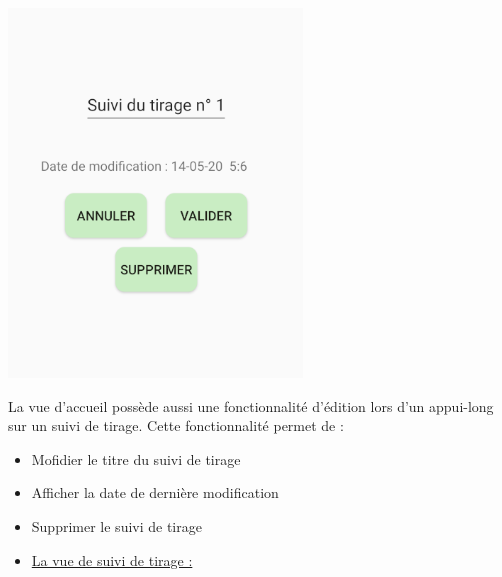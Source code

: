 \documentclass{article}
\begin{document}
    \begin{minipage}{.35\textwidth}%
        \includegraphics[scale=0.7]{edition.png}
    \end{minipage}%
    \hfill
    \begin{minipage}{.6\textwidth}%
    La vue d'accueil possède aussi une fonctionnalité d'édition lors d'un appui-long sur un suivi de tirage. Cette fonctionnalité permet de :
    \vspace{1em}
    \begin{itemize}
        \item Mofidier le titre du suivi de tirage
        \item Afficher la date de dernière modification
        \item Supprimer le suivi de tirage
    \end{itemize}
    \end{minipage}%
\vspace{4em}
\begin{itemize}
    \item {\underline{\large{La vue de suivi de tirage :}}}
\end{itemize}
\vspace{1em}
\end{document}
